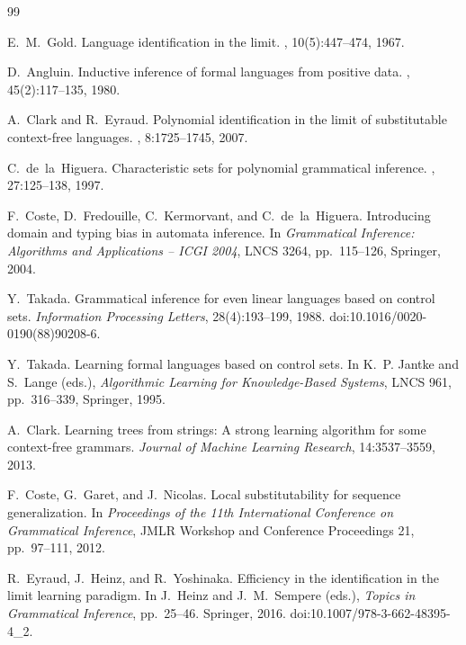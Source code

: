 \documentclass[11pt]{article}
\numberwithin{equation}{section}
\theoremstyle{plain}
\theoremstyle{definition}
\theoremstyle{remark}
\begin{document}
\begin{thebibliography}{99}

E.~M.~Gold.
\newblock Language identification in the limit.
, 10(5):447--474, 1967.

D.~Angluin.
\newblock Inductive inference of formal languages from positive data.
, 45(2):117--135, 1980.

A.~Clark and R.~Eyraud.
\newblock Polynomial identification in the limit of substitutable context-free
languages.
, 8:1725--1745, 2007.

C.~de~la~Higuera.
\newblock Characteristic sets for polynomial grammatical inference.
, 27:125--138, 1997.

F.~Coste, D.~Fredouille, C.~Kermorvant, and C.~de~la~Higuera.
\newblock Introducing domain and typing bias in automata inference.
\newblock In \emph{Grammatical Inference: Algorithms and Applications -- ICGI 2004},
LNCS 3264, pp.~115--126, Springer, 2004.

Y.~Takada.
\newblock Grammatical inference for even linear languages based on control sets.
\newblock \emph{Information Processing Letters}, 28(4):193--199, 1988.
\newblock doi:10.1016/0020-0190(88)90208-6.

Y.~Takada.
\newblock Learning formal languages based on control sets.
\newblock In K.~P. Jantke and S.~Lange (eds.), \emph{Algorithmic Learning
for Knowledge-Based Systems}, LNCS 961, pp.~316--339, Springer, 1995.

A.~Clark.
\newblock Learning trees from strings: A strong learning algorithm for some context-free grammars.
\newblock \emph{Journal of Machine Learning Research}, 14:3537--3559, 2013.

F.~Coste, G.~Garet, and J.~Nicolas.
\newblock Local substitutability for sequence generalization.
\newblock In {\em Proceedings of the 11th International Conference on
Grammatical Inference}, JMLR Workshop and Conference Proceedings 21,
pp.~97--111, 2012.

R.~Eyraud, J.~Heinz, and R.~Yoshinaka.
\newblock Efficiency in the identification in the limit learning paradigm.
\newblock In J.~Heinz and J.~M.~Sempere (eds.), {\em Topics in Grammatical
Inference}, pp.~25--46. Springer, 2016.
\newblock doi:10.1007/978-3-662-48395-4\_2.


\end{thebibliography}
\end{document}
